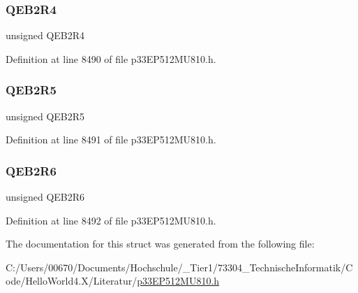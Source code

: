 \subsubsection{\texorpdfstring{Q\+E\+B2\+R4}{QEB2R4}}
{\footnotesize\ttfamily unsigned Q\+E\+B2\+R4}



Definition at line 8490 of file p33\+E\+P512\+M\+U810.\+h.

\mbox{\label{structtag_r_p_i_n_r16_b_i_t_s_a76338099d300605919dbbb4abaac6e76}} 
\subsubsection{\texorpdfstring{Q\+E\+B2\+R5}{QEB2R5}}
{\footnotesize\ttfamily unsigned Q\+E\+B2\+R5}



Definition at line 8491 of file p33\+E\+P512\+M\+U810.\+h.

\mbox{\label{structtag_r_p_i_n_r16_b_i_t_s_abff287f2e6531637a99cfa3efab3c7c8}} 
\subsubsection{\texorpdfstring{Q\+E\+B2\+R6}{QEB2R6}}
{\footnotesize\ttfamily unsigned Q\+E\+B2\+R6}



Definition at line 8492 of file p33\+E\+P512\+M\+U810.\+h.



The documentation for this struct was generated from the following file\+:\begin{DoxyCompactItemize}
\item 
C\+:/\+Users/00670/\+Documents/\+Hochschule/\+\_\+\+Tier1/73304\+\_\+\+Technische\+Informatik/\+Code/\+Hello\+World4.\+X/\+Literatur/\hyperlink{p33_e_p512_m_u810_8h}{p33\+E\+P512\+M\+U810.\+h}\end{DoxyCompactItemize}
